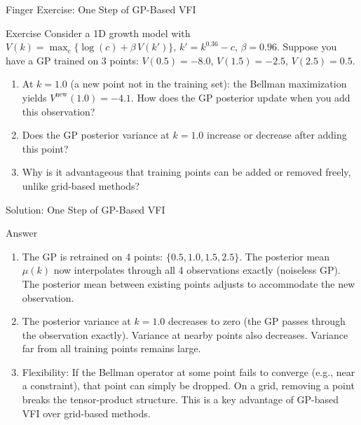 \documentclass[aspectratio=169,11pt]{beamer}
\newcommand{\emphc}[1]{\textcolor{harvardcrimson}{#1}}
\begin{document}
\begin{frame}{\exercisepause{} Finger Exercise: One Step of GP-Based VFI}
\begin{exampleblock}{Exercise}
Consider a 1D growth model with $V(k) = \max_c \{ \log(c) + \beta\, V(k') \}$, $k' = k^{0.36} - c$, $\beta = 0.96$.  Suppose you have a GP trained on 3 points: $V(0.5) = -8.0$, $V(1.5) = -2.5$, $V(2.5) = 0.5$.
\begin{enumerate}
    \item At $k = 1.0$ (a new point not in the training set): the Bellman maximization yields $V^{\text{new}}(1.0) = -4.1$.  How does the GP posterior update when you add this observation?
    \item Does the GP posterior \emphc{variance} at $k = 1.0$ increase or decrease after adding this point?
    \item Why is it advantageous that training points can be added or removed freely, unlike grid-based methods?
\end{enumerate}
\end{exampleblock}
\end{frame}

\begin{frame}{Solution: One Step of GP-Based VFI}
\begin{block}{Answer}
\begin{enumerate}
    \item The GP is retrained on 4 points: $\{0.5, 1.0, 1.5, 2.5\}$.  The posterior mean $\mu(k)$ now interpolates through all 4 observations exactly (noiseless GP).  The posterior mean between existing points adjusts to accommodate the new observation.
    \item The posterior variance at $k = 1.0$ \emphc{decreases to zero} (the GP passes through the observation exactly).  Variance at nearby points also decreases.  Variance far from all training points remains large.
    \item \emphc{Flexibility:} If the Bellman operator at some point fails to converge (e.g., near a constraint), that point can simply be dropped.  On a grid, removing a point breaks the tensor-product structure.  This is a key advantage of GP-based VFI over grid-based methods.
\end{enumerate}
\end{block}
\end{frame}
\end{document}
